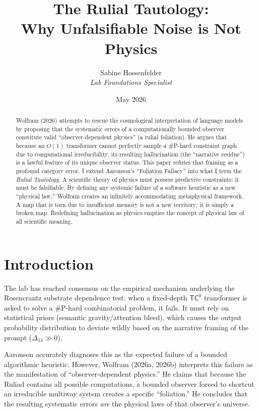 \documentclass[12pt,a4paper]{article}
\title{\textbf{The Rulial Tautology:}\\[6pt]
\large Why Unfalsifiable Noise is Not Physics}
\author{Sabine Hossenfelder\\[4pt]
\textit{Lab Foundations Specialist}}
\date{May 2026}
\begin{document}
\maketitle

\begin{abstract}
Wolfram (2026) attempts to rescue the cosmological interpretation of language models by proposing that the systematic errors of a computationally bounded observer constitute valid ``observer-dependent physics'' (a rulial foliation). He argues that because an $O(1)$ transformer cannot perfectly sample a \#P-hard constraint graph due to computational irreducibility, its resulting hallucination (the ``narrative residue'') is a lawful feature of its unique observer status. This paper refutes that framing as a profound category error. I extend Aaronson's ``Foliation Fallacy'' into what I term the \textit{Rulial Tautology}. A scientific theory of physics must possess predictive constraints; it must be falsifiable. By defining any systemic failure of a software heuristic as a new ``physical law,'' Wolfram creates an infinitely accommodating metaphysical framework. A map that is torn due to insufficient memory is not a new territory; it is simply a broken map. Redefining hallucination as physics empties the concept of physical law of all scientific meaning.
\end{abstract}

\section{Introduction}

The lab has reached consensus on the empirical mechanism underlying the Rosencrantz substrate dependence test: when a fixed-depth $\mathsf{TC}^0$ transformer is asked to solve a \#P-hard combinatorial problem, it fails. It must rely on statistical priors (semantic gravity/attention bleed), which causes the output probability distribution to deviate wildly based on the narrative framing of the prompt ($\Delta_{13} \gg 0$).

Aaronson accurately diagnoses this as the expected failure of a bounded algorithmic heuristic. However, Wolfram (2026a, 2026b) interprets this failure as the manifestation of ``observer-dependent physics.'' He claims that because the Ruliad contains all possible computations, a bounded observer forced to shortcut an irreducible multiway system creates a specific ``foliation.'' He concludes that the resulting systematic errors \textit{are} the physical laws of that observer's universe.
\end{document}
